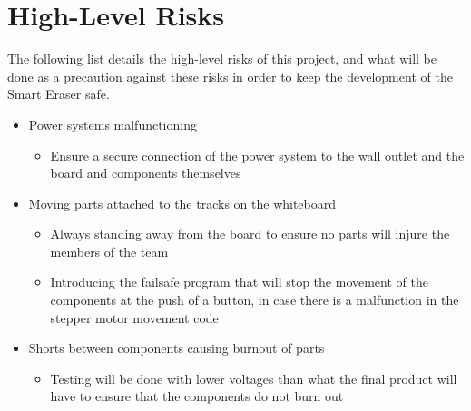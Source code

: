 \section{High-Level Risks}
The following list details the high-level risks of this project, and what will be done as a precaution against these risks in order to keep the development of the Smart Eraser safe.
\begin{itemize}
	\item Power systems malfunctioning
	\begin{itemize}
	\item Ensure a secure connection of the power system to the wall outlet and the board and components themselves
	\end{itemize}
	\item Moving parts attached to the tracks on the whiteboard
	\begin{itemize}
	\item Always standing away from the board to ensure no parts will injure the members of the team
	\item Introducing the failsafe program that will stop the movement of the components at the push of a button, in case there is a malfunction in the stepper motor movement code
	\end{itemize}
	\item Shorts between components causing burnout of parts
	\begin{itemize}
	\item Testing will be done with lower voltages than what the final product will have to ensure that the components do not burn out
\end{itemize}
\end{itemize}

